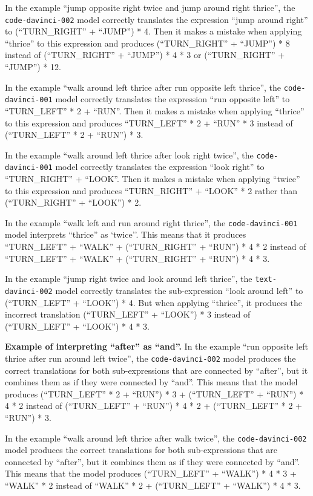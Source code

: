 In the example ``jump opposite right twice and jump around right thrice'', the  \texttt{code-davinci-002} model correctly translates the expression ``jump around right'' to (``TURN\_RIGHT'' + ``JUMP'') * 4.  Then it makes a mistake when applying ``thrice'' to this expression and produces (``TURN\_RIGHT'' + ``JUMP'') * 8 instead of (``TURN\_RIGHT'' + ``JUMP'') * 4 * 3 or (``TURN\_RIGHT'' + ``JUMP'') * 12.

In the example ``walk around left thrice after run opposite left thrice'', the \texttt{code-davinci-001} model correctly translates the expression ``run opposite left'' to ``TURN\_LEFT'' * 2 + ``RUN''. Then it makes a mistake when applying ``thrice'' to this expression and produces ``TURN\_LEFT'' * 2 + ``RUN'' * 3 instead of (``TURN\_LEFT'' * 2 + ``RUN'') * 3.

In the example ``walk around left thrice after look right twice'', the \texttt{code-davinci-001} model correctly translates the expression ``look right'' to ``TURN\_RIGHT'' + ``LOOK''. Then it makes a mistake when applying ``twice'' to this expression and produces ``TURN\_RIGHT'' + ``LOOK'' * 2 rather than (``TURN\_RIGHT'' + ``LOOK'') * 2.

In the example ``walk left and run around right thrice'', the \texttt{code-davinci-001} model interprets ``thrice'' as `twice''. This means that it produces ``TURN\_LEFT'' + ``WALK'' + (``TURN\_RIGHT'' + ``RUN'') * 4 * 2 instead of ``TURN\_LEFT'' + ``WALK'' + (``TURN\_RIGHT'' + ``RUN'') * 4 * 3.

In the example ``jump right twice and look around left thrice'', the \texttt{text-davinci-002} model correctly translates the sub-expression ``look around left'' to (``TURN\_LEFT'' + ``LOOK'') * 4. But when applying ``thrice'', it produces the incorrect translation (``TURN\_LEFT'' + ``LOOK'') * 3 instead of (``TURN\_LEFT'' + ``LOOK'') * 4 * 3.

\textbf{Example of interpreting ``after'' as ``and''.}
In the example ``run opposite left thrice after run around left twice'', the \texttt{code-davinci-002} model produces the correct translations for both sub-expressions that are connected by ``after'', but it combines them as if they were connected by ``and''. This means that the model produces (``TURN\_LEFT'' * 2 + ``RUN'') * 3 + (``TURN\_LEFT'' + ``RUN'') * 4 * 2 instead of (``TURN\_LEFT'' + ``RUN'') * 4 * 2 + (``TURN\_LEFT'' * 2 + ``RUN'') * 3.

In the example ``walk around left thrice after walk twice'', the \texttt{code-davinci-002} model produces the correct translations for both sub-expressions that are connected by ``after'', but it combines them as if they were connected by ``and''. This means that the model produces (``TURN\_LEFT'' + ``WALK'') * 4 * 3 + ``WALK'' * 2 instead of  ``WALK'' * 2 + (``TURN\_LEFT'' + ``WALK'') * 4 * 3.

